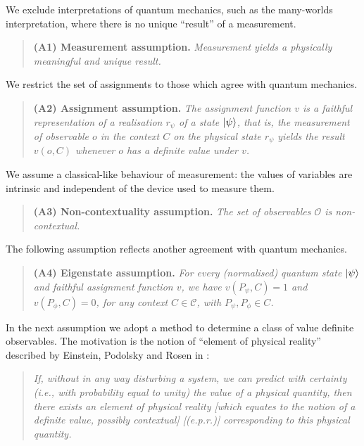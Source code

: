\documentclass[%
 preprint,
 showpacs,
 showkeys,
 preprintnumbers,
  amsmath,amssymb,
  aps,
 pra,
  longbibliography,
  floatfix,
 ]{revtex4-1}
\theoremstyle{plain}
\newcommand{\oprod}[2]{| #1 \rangle\langle #2 |}
\begin{document}
 \medskip

   We exclude  interpretations of quantum mechanics, such as the many-worlds
interpretation, where  there is no unique ``result'' of a measurement.


\begin{quote} {\bf (A1) Measurement assumption.} {\em Measurement yields a physically meaningful and unique result.}
\end{quote}


 We  restrict the set of assignments to those which agree with quantum mechanics.


 \begin{quote}   {\bf (A2) Assignment assumption.} {\em   The assignment function $v$ is   a
  \emph{faithful}  representation of a realisation $r_\psi$ of a state $\ket{\psi}$, that is,   the measurement of observable $o$ in the context $C$ on the physical state $r_\psi$ yields the result $v(o,C)$ whenever $o$ has a definite value under $v$.}
\end{quote}



We assume a classical-like behaviour of measurement: the values of variables are intrinsic and independent of the device used to measure them.

 \begin{quote}  {\bf (A3)  Non-contextuality assumption.} {\em The set of observables $\mathcal{O}$ is non-contextual.}
\end{quote}

 The following assumption reflects another  agreement with quantum mechanics.


\begin{quote}   {\bf (A4) Eigenstate assumption.} {\em For every  (normalised) quantum state  $\ket{\psi}$ and  faithful assignment function $v$, we have $v(P_\psi,C)=1$ and $v(P_\phi,C)=0$, for
any context $C\in\mathcal{C}$, with $P_\psi,P_\phi\in C$.}
\end{quote}


 In the next assumption we adopt a method to determine a class of value definite observables. The motivation is the notion of ``element of physical reality''  described by
 Einstein, Podolsky and Rosen in \cite[p.\ 777]{epr}:

\begin{quote}
 \em       If, without in any way disturbing a system, we can predict with certainty (i.e., with probability equal to unity)
the value of a physical quantity, then there exists an element of physical reality {\rm [which equates to the notion of a definite value, possibly contextual]} {\rm [(}e.p.r.{\rm )]}  corresponding to this physical quantity.
\end{quote}
\end{document}

